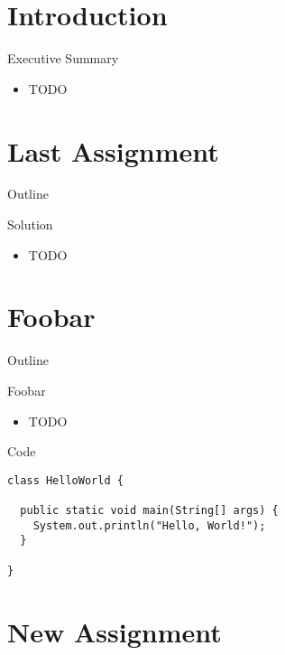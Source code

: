 \section*{Introduction}

\begin{frame}{Executive Summary}
  \begin{itemize}
  \item TODO
  \end{itemize}
\end{frame}


\section{Last Assignment}

\begin{frame}{Outline}
  \tableofcontents[current]
\end{frame}

\begin{frame}{Solution}
  \begin{itemize}
  \item TODO
  \end{itemize}
\end{frame}


\section{Foobar}

\begin{frame}{Outline}
  \tableofcontents[current]
\end{frame}

\begin{frame}{Foobar}
  \begin{itemize}
  \item TODO
  \end{itemize}
\end{frame}

\begin{frame}[fragile]{Code}
  \begin{lstlisting}
class HelloWorld {

  public static void main(String[] args) {
    System.out.println("Hello, World!");
  }

}
  \end{lstlisting}
\end{frame}


\section{New Assignment}

